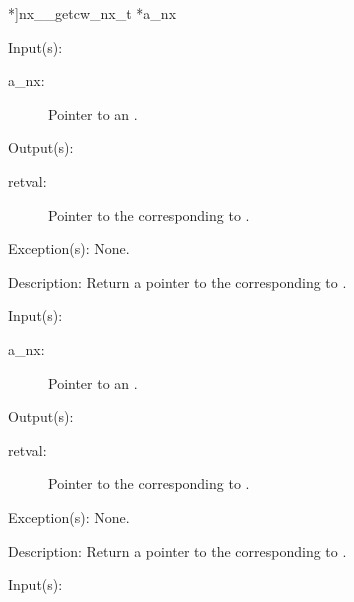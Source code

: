 \begin{capi}
{*]{nx\_\_get}{cw\_nx\_t *a\_nx}}
	\begin{capilist}
	\item[Input(s): ]
		\begin{description}\item[]
		\item[a\_nx: ]
			Pointer to an .
		\end{description}
	\item[Output(s): ]
		\begin{description}\item[]
		\item[retval: ]
			Pointer to the  corresponding to
			.
		\end{description}
	\item[Exception(s): ] None.
	\item[Description: ]
		Return a pointer to the  corresponding to
		.
	\end{capilist}
\label{nx_gcdict_get}
	\begin{capilist}
	\item[Input(s): ]
		\begin{description}\item[]
		\item[a\_nx: ]
			Pointer to an \classname{nx}.
		\end{description}
	\item[Output(s): ]
		\begin{description}\item[]
		\item[retval: ]
			Pointer to the  corresponding to
			\onyxop{gcdict}{}.
		\end{description}
	\item[Exception(s): ] None.
	\item[Description: ]
		Return a pointer to the  corresponding to
		\onyxop{gcdict}{}.
	\end{capilist}
\label{nx_stdin_get}
	\begin{capilist}
	\item[Input(s): ]
		\begin{description}\item[]

\end{description}
\end{capilist}
\end{capi}
